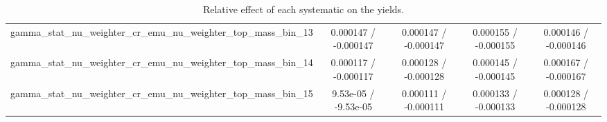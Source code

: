 \documentclass[10pt]{article}
\begin{document}
\begin{table}[htbp]
\begin{center}
\begin{tabular}{|c|c|c|c|c|}
  gamma_stat_nu_weighter_cr_emu_nu_weighter_top_mass_bin_13 & 0.000147 / -0.000147 & 0.000147 / -0.000147 & 0.000155 / -0.000155 & 0.000146 / -0.000146 \\ 
  gamma_stat_nu_weighter_cr_emu_nu_weighter_top_mass_bin_14 & 0.000117 / -0.000117 & 0.000128 / -0.000128 & 0.000145 / -0.000145 & 0.000167 / -0.000167 \\ 
  gamma_stat_nu_weighter_cr_emu_nu_weighter_top_mass_bin_15 & 9.53e-05 / -9.53e-05 & 0.000111 / -0.000111 & 0.000133 / -0.000133 & 0.000128 / -0.000128 \\ 
\hline 
\end{tabular} 
\caption{Relative effect of each systematic on the yields.} 
\end{center} 
\end{table} 
\end{document}

